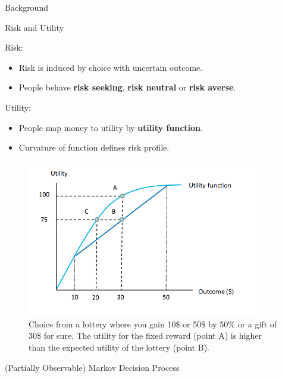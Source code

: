 \begin{exampleblock}{Background}

\begin{block}{Risk and Utility}

Risk: 
\begin{itemize}
    \item Risk is induced by choice with uncertain outcome.
    \item People behave \textbf{risk seeking}, \textbf{risk neutral} or \textbf{risk averse}.
\end{itemize}

 Utility:
\begin{itemize}
    \item People map money to utility by \textbf{utility function}.
    \item Curvature of function defines risk profile.
\end{itemize}


\begin{figure}
  \centering
    \includegraphics[width=0.9\textwidth]{img/background/riskaversion.jpg}
  \caption{Choice from a lottery where you gain 10\$ or 50\$ by 50\% or a gift of 30\$ for sure. The utility for the fixed reward (point A) is higher than the expected utility of the lottery (point B).}
  
\end{figure}

\end{block}


\begin{block}{(Partially Observable) Markov Decision Process}


\end{block}
\end{exampleblock}
